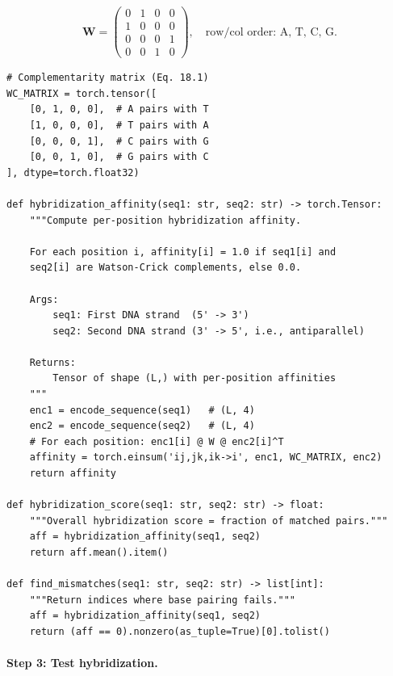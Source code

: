 \begin{equation}
\mathbf{W} = \begin{pmatrix}
0 & 1 & 0 & 0 \\
1 & 0 & 0 & 0 \\
0 & 0 & 0 & 1 \\
0 & 0 & 1 & 0
\end{pmatrix},
\quad \text{row/col order: A, T, C, G}.
\label{eq:wc-matrix}
\end{equation}

\begin{lstlisting}[style=dogmapython, caption={Lab 1: Complementarity matrix and hybridization.}]
# Complementarity matrix (Eq. 18.1)
WC_MATRIX = torch.tensor([
    [0, 1, 0, 0],  # A pairs with T
    [1, 0, 0, 0],  # T pairs with A
    [0, 0, 0, 1],  # C pairs with G
    [0, 0, 1, 0],  # G pairs with C
], dtype=torch.float32)

def hybridization_affinity(seq1: str, seq2: str) -> torch.Tensor:
    """Compute per-position hybridization affinity.

    For each position i, affinity[i] = 1.0 if seq1[i] and
    seq2[i] are Watson-Crick complements, else 0.0.

    Args:
        seq1: First DNA strand  (5' -> 3')
        seq2: Second DNA strand (3' -> 5', i.e., antiparallel)

    Returns:
        Tensor of shape (L,) with per-position affinities
    """
    enc1 = encode_sequence(seq1)   # (L, 4)
    enc2 = encode_sequence(seq2)   # (L, 4)
    # For each position: enc1[i] @ W @ enc2[i]^T
    affinity = torch.einsum('ij,jk,ik->i', enc1, WC_MATRIX, enc2)
    return affinity

def hybridization_score(seq1: str, seq2: str) -> float:
    """Overall hybridization score = fraction of matched pairs."""
    aff = hybridization_affinity(seq1, seq2)
    return aff.mean().item()

def find_mismatches(seq1: str, seq2: str) -> list[int]:
    """Return indices where base pairing fails."""
    aff = hybridization_affinity(seq1, seq2)
    return (aff == 0).nonzero(as_tuple=True)[0].tolist()
\end{lstlisting}

\paragraph{Step 3: Test hybridization.}

